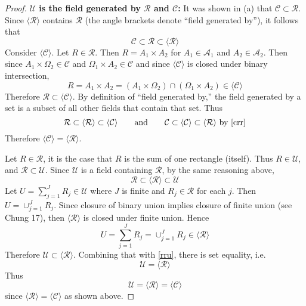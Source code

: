 \documentclass[letterpaper, 12pt]{article}
\newcommand{\cA}{\mathcal{A}}
\newcommand{\cC}{\mathcal{C}}
\newcommand{\cR}{\mathcal{R}}
\newcommand{\cU}{\mathcal{U}}
\begin{document}
\begin{enumerate}
\begin{enumerate}[(a)]
\begin{proof}
\textbf{$\cU$ is the field generated by $\cR$ and $\cC$:}
It was shown in (a) that $\cC \subset \cR$. Since $\langle \cR \rangle$ contains $\cR$ 
(the angle brackets denote ``field generated by''), it follows that 
\begin{equation}
\label{crr}
\cC \subset \cR \subset \langle \cR \rangle
\end{equation}
Consider $\langle \cC \rangle$. Let $R \in \cR$. Then
$R = A_1 \times A_2$ for $A_1 \in \cA_1$ and $A_2 \in \cA_2$. Then since $A_1 \times \Omega_2 \in \cC$ and $\Omega_1 \times A_2 \in \cC$ and since $\langle \cC \rangle$ is closed under binary intersection, 
\[
R = A_1 \times A_2 = (A_1 \times \Omega_2) \cap (\Omega_1 \times A_2) \in \langle \cC \rangle
\]
Therefore $\cR \subset \langle\cC\rangle$. By definition of ``field generated by,'' the field generated by a set is a subset of all other fields that contain that set. Thus
\[
\cR \subset \langle\cR\rangle \subset \langle\cC\rangle
\qquad
\text{and}
\qquad
\cC \subset \langle \cC \rangle \subset \langle\cR\rangle
\text{ by \eqref{crr}}
\] 
Therefore $\langle \cC \rangle  = \langle \cR \rangle$.


Let $R \in \cR$, it is the case that $R$ is the sum of one rectangle (itself). Thus $R \in \cU$, and $\cR \subset \cU$. Since $\cU$ is a field containing $\cR$, by the same reasoning above,
\begin{equation}
\label{rru}
\cR 
\subset 
\langle \cR \rangle
\subset
\cU
\end{equation}
Let $U = \sum_{j=1}^J R_j \in \cU$ where $J$ is finite and $R_j \in \cR$ for each $j$. Then $U = \cup_{j=1}^J R_j$. Since closure of binary union implies closure of finite union (see Chung 17), then $\langle \cR \rangle$ is closed under finite union. Hence 
\[
U = \sum_{j=1}^J R_j = \cup_{j=1}^J R_j \in \langle \cR \rangle
\]
Therefore $\cU \subset \langle \cR \rangle$. Combining that with \eqref{rru}, there is set equality, i.e.
\[
\cU = \langle \cR \rangle
\]
Thus 
\[
\cU = \langle \cR \rangle = \langle \cC \rangle
\]
since $\langle \cR \rangle = \langle \cC \rangle$ as shown above.
\end{proof}


\end{enumerate}
\end{enumerate}
\end{document}
